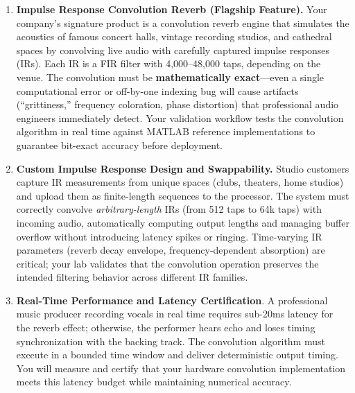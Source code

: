 \documentclass[11pt,letterpaper]{article}
\begin{document}
\begin{enumerate}[leftmargin=0.4in]
    \item \textbf{Impulse Response Convolution Reverb (Flagship Feature).} Your company's signature product is a convolution reverb engine that simulates the acoustics of famous concert halls, vintage recording studios, and cathedral spaces by convolving live audio with carefully captured impulse responses (IRs). Each IR is a FIR filter with 4,000--48,000 taps, depending on the venue. The convolution must be \textbf{mathematically exact}---even a single computational error or off-by-one indexing bug will cause artifacts (``grittiness,'' frequency coloration, phase distortion) that professional audio engineers immediately detect. Your validation workflow tests the convolution algorithm in real time against MATLAB reference implementations to guarantee bit-exact accuracy before deployment.

    \item \textbf{Custom Impulse Response Design and Swappability.} Studio customers capture IR measurements from unique spaces (clubs, theaters, home studios) and upload them as finite-length sequences to the processor. The system must correctly convolve \emph{arbitrary-length} IRs (from 512 taps to 64k taps) with incoming audio, automatically computing output lengths and managing buffer overflow without introducing latency spikes or ringing. Time-varying IR parameters (reverb decay envelope, frequency-dependent absorption) are critical; your lab validates that the convolution operation preserves the intended filtering behavior across different IR families.

    \item \textbf{Real-Time Performance and Latency Certification}.  A professional music producer recording vocals in real time requires sub-20ms latency for the reverb effect; otherwise, the performer hears echo and loses timing synchronization with the backing track. The convolution algorithm must execute in a bounded time window and deliver deterministic output timing. You will measure and certify that your hardware convolution implementation meets this latency budget while maintaining numerical accuracy.
\end{enumerate}
\end{document}
